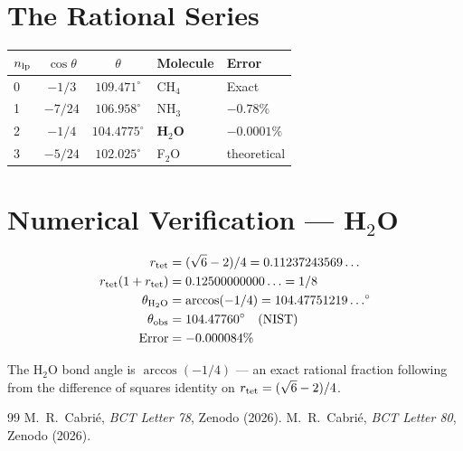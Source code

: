 \documentclass[aps,prl,twocolumn,showpacs,superscriptaddress]{revtex4-2}
\begin{document}
\section{The Rational Series}

\begin{center}
\begin{tabular}{lccll}
\toprule
$n_{\rm lp}$ & $\cos\theta$ & $\theta$ & Molecule & Error \\
\midrule
0 & $-1/3$ & $109.471^\circ$ & CH$_4$ & Exact \\
1 & $-7/24$ & $106.958^\circ$ & NH$_3$ & $-0.78\%$ \\
2 & $-1/4$ & $\mathbf{104.4775^\circ}$ & \textbf{H$_2$O} & $\mathbf{-0.0001\%}$ \\
3 & $-5/24$ & $102.025^\circ$ & F$_2$O & theoretical \\
\bottomrule
\end{tabular}
\end{center}

\section{Numerical Verification --- H$_2$O}

\begin{align}
r_{\rm tet} &= (\sqrt{6}-2)/4 = 0.11237243569\ldots\\
r_{\rm tet}(1+r_{\rm tet}) &= 0.12500000000\ldots = 1/8\\
\theta_{\rm H_2O} &= \arccos(-1/4) = 104.47751219\ldots^\circ\\
\theta_{\rm obs} &= 104.47760^\circ\quad\text{(NIST)}\\
\text{Error} &= -0.000084\%
\end{align}

The H$_2$O bond angle is $\arccos(-1/4)$ --- an exact rational 
fraction following from the difference of squares identity on 
$r_{\rm tet} = (\sqrt{6}-2)/4$.

\begin{thebibliography}{99}
 M.~R.~Cabri\'e, \textit{BCT Letter 78}, Zenodo (2026).
 M.~R.~Cabri\'e, \textit{BCT Letter 80}, Zenodo (2026).
\end{thebibliography}
\end{document}
